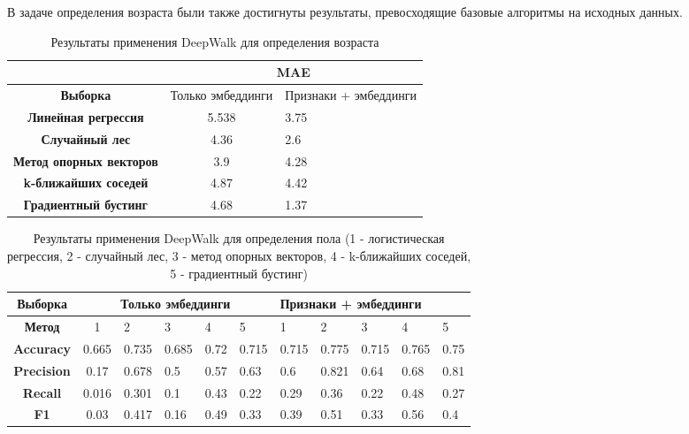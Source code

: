 В задаче определения возраста были также достигнуты результаты, превосходящие базовые алгоритмы на исходных данных.

\begin{table}[h!]
\centering
\begin{tabular}{|c|c|l|}
\hline
\textbf{}                       & \multicolumn{2}{c|}{MAE}                  \\ \hline
\textbf{Выборка}                & Только эмбеддинги & Признаки + эмбеддинги \\ \hline
\textbf{Линейная регрессия}     & 5.538             & 3.75                  \\ \hline
\textbf{Случайный лес}          & 4.36              & 2.6                   \\ \hline
\textbf{Метод опорных векторов} & 3.9               & 4.28                  \\ \hline
\textbf{k-ближайших соседей}    & 4.87              & 4.42                  \\ \hline
\textbf{Градиентный бустинг}    & 4.68              & 1.37     \\ \hline
\end{tabular}
\caption{Результаты применения DeepWalk для определения возраста}
\label{DeepWalk age table}
\end{table}

\begin{table}[h!]
\centering
\begin{tabular}{|c|c|l|l|l|l|l|l|l|l|l|}
\hline
\textbf{Выборка}   & \multicolumn{5}{c|}{Только эмбеддинги} & \multicolumn{5}{l|}{Признаки + эмбеддинги} \\ \hline
\textbf{Метод}     & 1   & 2      & 3      & 4     & 5      & 1   & 2       & 3       & 4       & 5      \\ \hline
\textbf{Accuracy}  & 0.665    & 0.735  & 0.685  & 0.72  & 0.715  &  0.715   & 0.775   & 0.715   & 0.765   & 0.75   \\ \hline
\textbf{Precision} &   0.17  & 0.678  & 0.5    & 0.57  & 0.63   &   0.6  & 0.821   & 0.64    & 0.68    & 0.81   \\ \hline
\textbf{Recall}    &  0.016  & 0.301  & 0.1    & 0.43  & 0.22   &  0.29   & 0.36    & 0.22    & 0.48    & 0.27   \\ \hline
\textbf{F1}        & 0.03    & 0.417  & 0.16   & 0.49  & 0.33   &  0.39   & 0.51    & 0.33    & 0.56    & 0.4    \\ \hline
\end{tabular}
\caption{Результаты применения DeepWalk для определения пола (1 - логистическая регрессия, 2 - случайный лес, 3 - метод опорных векторов, 4 - k-ближайших соседей, 5 - градиентный бустинг)}
\label{DeepWalk gender table}
\end{table}




